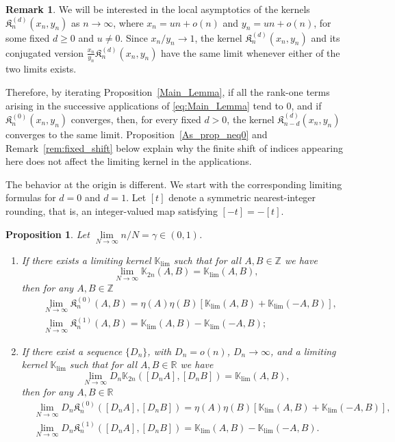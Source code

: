 \documentclass[reqno,11pt]{amsart}
\newcommand{\ZZ}{\mathbb{Z}}
\newcommand{\RR}{\mathbb{R}}
\theoremstyle{plain}
\newtheorem{prop}[thm]{Proposition}
\theoremstyle{definition}
\newtheorem{remark}[thm]{Remark}
\numberwithin{equation}{section}
\begin{document}
\begin{remark}
We will be interested in the local asymptotics of the kernels
$\mathfrak K_n^{(d)}(x_n,y_n)$ as $n\to\infty$, where $x_n=un + o(n)$ and $y_n=u n + o(n)$, for some fixed $d\ge0$ and $u\neq0$. Since ${x_n}/{y_n}\longrightarrow 1$, the kernel $\mathfrak K_n^{(d)}(x_n,y_n)$ and its conjugated version $\frac{x_n}{y_n}\mathfrak K_n^{(d)}(x_n,y_n)$ have the same limit whenever either of the two limits exists. 

Therefore, by iterating Proposition~\ref{Main_Lemma}, if all the rank-one terms arising in the successive applications of \eqref{eq:Main_Lemma} tend to $0$, 
and if $\mathfrak K_{n}^{(0)}(x_n,y_n)$ converges, then, for every fixed $d>0$, the kernel $\mathfrak K_{n-d}^{(d)}(x_n,y_n)$ converges to the same limit.
Proposition~\ref{As_prop_neq0} and Remark~\ref{rem:fixed_shift} below explain why the finite shift of indices appearing here does not affect the limiting kernel in the applications.
\end{remark}
The behavior at the origin is different. We start with the corresponding limiting formulas for $d=0$ and $d=1$.
Let $[t]$ denote a symmetric nearest-integer rounding, that is, an integer-valued map satisfying
$[-t] = -[t].$
\begin{prop}\label{As_prop_0}
Let $\lim\limits_{N\to \infty}n/N=\gamma\in(0,1)$.
\begin{enumerate}
\item 
If there exists a limiting kernel $\mathbb{K}_{\lim}$
such that for all $A,B\in\ZZ$ we have
$$
\lim_{N\to \infty} \mathbb{K}_{2n}(A,B)= \mathbb{K}_{\lim}(A,B),
$$
then for any $A,B\in\ZZ$ 
	\begin{align*}
		&\lim_{N\to \infty} \mathfrak{K}^{(0)}_n(A,B) =  
        \eta(A)\eta(B)
\left[
\mathbb K_{\lim}(A,B)
+
\mathbb K_{\lim}(-A,B)
\right],
\\
 		&\lim_{N\to \infty} \mathfrak{K}^{(1)}_n(A,B) = 
        \mathbb{K}_{\lim}(A,B)-\mathbb{K}_{\lim}(-A,B);       
	\end{align*} 
\item 
If there exist a sequence $\{D_n\}$, with $D_n = o(n)$, $D_n\to\infty$,
and a limiting kernel $\mathbb{K}_{\lim}$
such that for all $A,B\in\RR$ we have
$$
\lim_{N\to \infty}D_n \mathbb{K}_{2n}([ D_n A],[ D_n B])= \mathbb{K}_{\lim}(A,B),
$$
then for any $A,B\in\RR$ 
	\begin{align*}
		&\lim_{N\to \infty} D_n\mathfrak{K}^{(0)}_n([ D_n A ], [ D_n B ]) = \eta(A)\eta(B)\left[ \mathbb{K}_{\lim}(A,B)+\mathbb{K}_{\lim}(-A,B)\right],
\\
 		&\lim_{N\to \infty} D_n\mathfrak{K}^{(1)}_n([ D_n A ], [ D_n B ]) = 
\mathbb K_{\lim}(A,B)-\mathbb K_{\lim}(-A,B).    
	\end{align*} 
\end{enumerate}
\end{prop}
\end{document}

